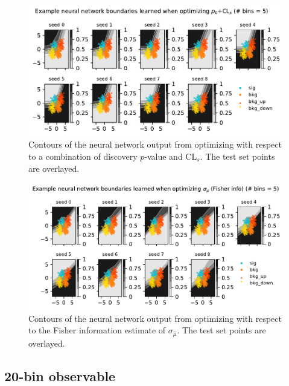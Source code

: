 \documentclass[
  11pt,
  numbers=noendperiod]{book}
\begin{document}
\begin{figure}

{\centering \includegraphics{./images/new-grid-models-COMB-5nobin (1).pdf}

}

\caption{\label{fig-grid-5bin-comb}Contours of the neural network output
from optimizing with respect to a combination of discovery \(p\)-value
and \(\mathrm{CL}_s\). The test set points are overlayed.}

\end{figure}

\begin{figure}

{\centering \includegraphics{./images/new-grid-models-poi_uncert-5nobin (1).pdf}

}

\caption{\label{fig-grid-5bin-poi-uncert}Contours of the neural network
output from optimizing with respect to the Fisher information estimate
of \(\sigma_{\hat{\mu}}\). The test set points are overlayed.}

\end{figure}

\hypertarget{bin-observable-1}{%
\subsection{20-bin observable}\label{bin-observable-1}}
\end{document}
